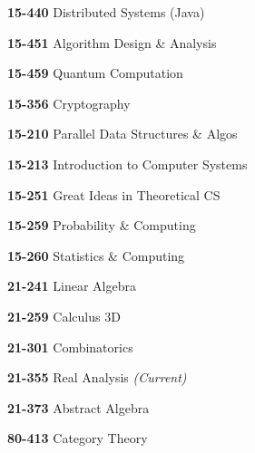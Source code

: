 \begin{cventries}
{\begin{cvitems}
\begin{multicols}{3}
          \item[] {\textbf{15-440} Distributed Systems (Java)}
          \item[] {\textbf{15-451} Algorithm Design \& Analysis}
          \item[] {\textbf{15-459} Quantum Computation}
          \item[] {\textbf{15-356} Cryptography}
          \item[] {\textbf{15-210} Parallel Data Structures \& Algos}
          \item[] {\textbf{15-213} Introduction to Computer Systems}
          \item[] {\textbf{15-251} Great Ideas in Theoretical CS}
          \item[] {\textbf{15-259} Probability \& Computing}
          \item[] {\textbf{15-260} Statistics \& Computing}
          \item[] {\textbf{21-241} Linear Algebra}
          \item[] {\textbf{21-259} Calculus 3D}
          \item[] {\textbf{21-301} Combinatorics}
          \item[] {\textbf{21-355} Real Analysis
		  	\textit{\color{awesome}(Current)}}
          \item[] {\textbf{21-373} Abstract Algebra}
          \item[] {\textbf{80-413} Category Theory}
        \end{multicols}
      \end{cvitems}
    }
\end{cventries}
